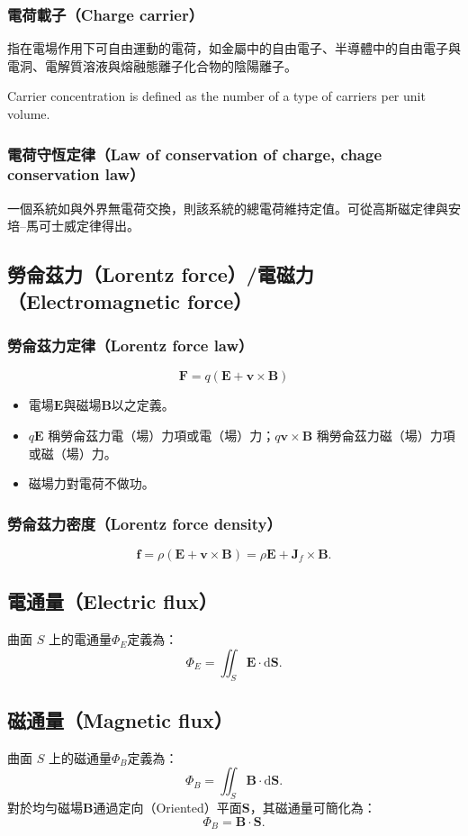 \documentclass[a4paper,12pt]{report}
\begin{document}
\begin{itemize}
\subsubsection{電荷載子（Charge carrier）}
指在電場作用下可自由運動的電荷，如金屬中的自由電子、半導體中的自由電子與電洞、電解質溶液與熔融態離子化合物的陰陽離子。

Carrier concentration is defined as the number of a type of carriers per unit volume.
\subsubsection{電荷守恆定律（Law of conservation of charge, chage conservation law）}
一個系統如與外界無電荷交換，則該系統的總電荷維持定值。可從高斯磁定律與安培–馬可士威定律得出。
\subsection{勞侖茲力（Lorentz force）/電磁力（Electromagnetic force）}
\subsubsection{勞侖茲力定律（Lorentz force law）}
\[\mathbf{F} = q (\mathbf{E} + \mathbf{v} \times \mathbf{B})\]
\begin{itemize}
\item 電場$\mathbf{E}$與磁場$\mathbf{B}$以之定義。
\item $q\mathbf{E}$ 稱勞侖茲力電（場）力項或電（場）力；$q\mathbf{v} \times \mathbf{B}$ 稱勞侖茲力磁（場）力項或磁（場）力。
\item 磁場力對電荷不做功。
\end{itemize}
\subsubsection{勞侖茲力密度（Lorentz force density）}
\[\mathbf{f} = \rho (\mathbf{E} + \mathbf{v} \times \mathbf{B}) = \rho \mathbf{E} + \mathbf{J}_f \times \mathbf{B}.\]
\subsection{電通量（Electric flux）}
曲面 $S$ 上的電通量$\Phi_{E}$定義為：
\[\Phi_{E}=\iint _{S}\mathbf {E} \cdot \mathrm{d}\mathbf{S}.\]
\subsection{磁通量（Magnetic flux）}
曲面 $S$ 上的磁通量$\Phi_{B}$定義為：
\[\Phi_{B}=\iint _{S}\mathbf {B} \cdot \mathrm{d}\mathbf{S}.\]
對於均勻磁場$\mathbf{B}$通過定向（Oriented）平面$\mathbf{S}$，其磁通量可簡化為：
\[\Phi_{B}=\mathbf{B}\cdot\mathbf{S}.\]

\end{itemize}
\end{document}

